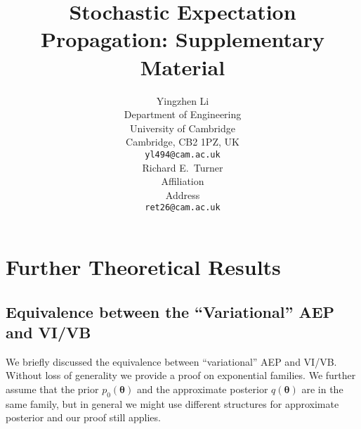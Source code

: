 \documentclass{article} %
\title{Stochastic Expectation Propagation: Supplementary Material}
\author{
Yingzhen Li \\
Department of Engineering\\
University of Cambridge\\
Cambridge, CB2 1PZ, UK \\
\texttt{yl494@cam.ac.uk} \\
\And
Richard E.~Turner \\
Affiliation \\
Address \\
\texttt{ret26@cam.ac.uk} \\
}
\begin{document}
\maketitle

\appendix

\section{Further Theoretical Results}


\subsection{Equivalence between the ``Variational'' AEP and VI/VB}
We briefly discussed the equivalence between ``variational'' AEP and VI/VB.  
%
Without loss of generality we provide a proof on exponential families. We further assume that the prior $p_0(\bm{\theta})$ and the approximate posterior $q(\bm{\theta})$ are in the same family, but in general we might use different structures for approximate posterior and our proof still applies. 
\end{document}
